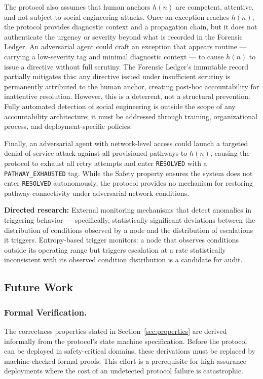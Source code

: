 The protocol also assumes that human anchors $h(n)$ are competent, attentive, and not subject to social engineering attacks. Once an exception reaches $h(n)$, the protocol provides diagnostic context and a propagation chain, but it does not authenticate the urgency or severity beyond what is recorded in the Forensic Ledger. An adversarial agent could craft an exception that appears routine — carrying a low-severity tag and minimal diagnostic context — to cause $h(n)$ to issue a directive without full scrutiny. The Forensic Ledger's immutable record partially mitigates this: any directive issued under insufficient scrutiny is permanently attributed to the human anchor, creating post-hoc accountability for inattentive resolution. However, this is a deterrent, not a structural prevention. Fully automated detection of social engineering is outside the scope of any accountability architecture; it must be addressed through training, organizational process, and deployment-specific policies.

Finally, an adversarial agent with network-level access could launch a targeted denial-of-service attack against all provisioned pathways to $h(n)$, causing the protocol to exhaust all retry attempts and enter \texttt{RESOLVED} with a \texttt{PATHWAY\_EXHAUSTED} tag. While the Safety property ensures the system does not enter \texttt{RESOLVED} autonomously, the protocol provides no mechanism for restoring pathway connectivity under adversarial network conditions.

\medskip\noindent\textbf{Directed research:} External monitoring mechanisms that detect anomalies in triggering behavior — specifically, statistically significant deviations between the distribution of conditions observed by a node and the distribution of escalations it triggers. Entropy-based trigger monitors: a node that observes conditions outside its operating range but triggers escalation at a rate statistically inconsistent with its observed condition distribution is a candidate for audit.

\subsection{Future Work}

\subsubsection{Formal Verification.}
The correctness properties stated in Section~\ref{sec:properties} are derived informally from the protocol's state machine specification. Before the protocol can be deployed in safety-critical domains, these derivations must be replaced by machine-checked formal proofs. This effort is a prerequisite for high-assurance deployments where the cost of an undetected protocol failure is catastrophic.

